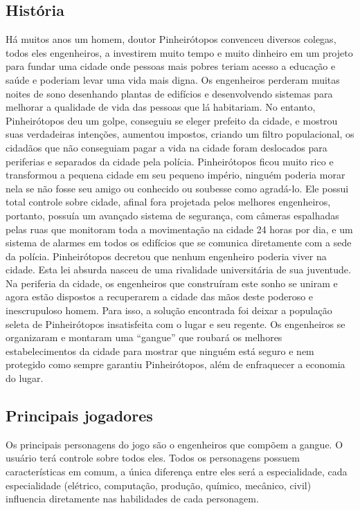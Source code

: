 \subsection{História}
Há muitos anos um homem, doutor Pinheirótopos convenceu diversos colegas, todos eles engenheiros, a investirem muito tempo e muito dinheiro em um projeto para fundar uma cidade onde pessoas mais pobres teriam acesso a educação e saúde e poderiam levar uma vida mais digna. Os engenheiros perderam muitas noites de sono desenhando plantas de edifícios e desenvolvendo sistemas para melhorar a qualidade de vida das pessoas que lá habitariam. 
No entanto, Pinheirótopos deu um golpe, conseguiu se eleger prefeito da cidade, e mostrou suas verdadeiras intenções, aumentou impostos, criando um filtro populacional, os cidadãos que não conseguiam pagar a vida na cidade foram deslocados para periferias e separados da cidade pela polícia.
Pinheirótopos ficou muito rico e transformou a pequena cidade em seu pequeno império, ninguém poderia morar nela se não fosse seu amigo ou conhecido ou soubesse como agradá-lo. Ele possui total controle sobre cidade, afinal fora projetada pelos melhores engenheiros, portanto, possuía um avançado sistema de segurança, com câmeras espalhadas pelas ruas que monitoram toda a movimentação na cidade 24 horas por dia, e um sistema de alarmes em todos os edifícios que se comunica diretamente com a sede da polícia.
Pinheirótopos decretou que nenhum engenheiro poderia viver na cidade. Esta lei absurda nasceu de uma rivalidade universitária de sua juventude.
Na periferia da cidade, os engenheiros que construíram este sonho se uniram e agora estão dispostos a recuperarem a cidade das mãos deste poderoso e inescrupuloso homem. Para isso, a solução encontrada foi deixar a população seleta de Pinheirótopos insatisfeita com o lugar e seu regente. Os engenheiros se organizaram e montaram uma “gangue” que roubará os melhores estabelecimentos da cidade para mostrar que ninguém está seguro e nem protegido como sempre garantiu Pinheirótopos, além de enfraquecer a economia do lugar.

\subsection{Principais jogadores}
Os principais personagens do jogo são o engenheiros que compõem a gangue. O usuário terá controle sobre todos eles.
Todos os personagens possuem características em comum, a única diferença entre eles será a especialidade, cada especialidade (elétrico, computação, produção, químico, mecânico, civil) influencia diretamente nas habilidades de cada personagem.

